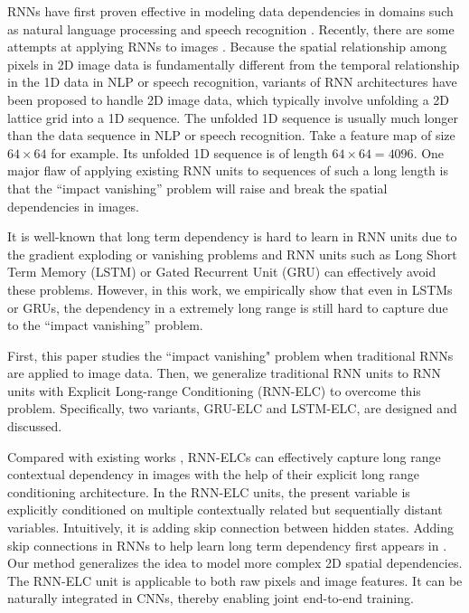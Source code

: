 \documentclass[10pt,twocolumn,letterpaper]{article}
\begin{document}
RNNs have first proven effective in modeling data dependencies in domains such as natural language processing and speech recognition \cite{11,12}. Recently, there are some attempts at applying RNNs to images \cite{10,14,16,17}. Because the spatial relationship among pixels in 2D image data is fundamentally different from the temporal relationship in the 1D data in NLP or speech recognition, variants of RNN architectures \cite{23, 16, 14, 24, 25, 26, 28} have been proposed to handle 2D image data, which typically involve unfolding a 2D lattice grid into a 1D sequence. The unfolded 1D sequence is usually much longer than the data sequence in NLP or speech recognition. Take a feature map of size $64\times64$ for example. Its unfolded 1D sequence is of length $64\times64=4096$. One major flaw of applying existing RNN units to sequences of such a long length is that the ``impact vanishing'' problem will raise and break the spatial dependencies in images.

It is well-known that long term dependency is hard to learn in RNN units due to the gradient exploding or vanishing problems and RNN units such as Long Short Term Memory (LSTM) or Gated Recurrent Unit (GRU) can effectively avoid these problems. However, in this work, we empirically show that even in LSTMs or GRUs, the dependency in a extremely long range is still hard to capture due to the ``impact vanishing'' problem.


First, this paper studies the ``impact vanishing" problem when traditional RNNs are applied to image data. Then, we generalize traditional RNN units to RNN units with Explicit Long-range Conditioning (RNN-ELC) to overcome this problem. Specifically, two variants, GRU-ELC and LSTM-ELC, are designed and discussed.

Compared with existing works \cite{23, 16, 14, 24, 25, 26, 28}, RNN-ELCs can effectively capture long range contextual dependency in images with the help of their explicit long range conditioning architecture. In the RNN-ELC units, the present variable is explicitly conditioned on multiple contextually related but sequentially distant variables. Intuitively, it is adding skip connection between hidden states. Adding skip connections in RNNs to help learn long term dependency first appears in \cite{33}. Our method generalizes the idea to model more complex 2D spatial dependencies. The RNN-ELC unit is applicable to both raw pixels and image features. It can be naturally integrated in CNNs, thereby enabling joint end-to-end training. 
\end{document}
